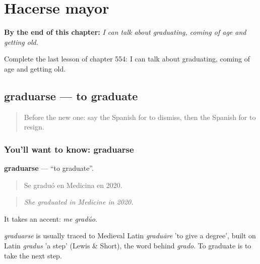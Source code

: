 
\chapter{Hacerse mayor}
\label{ch:es-hacerse-mayor}

\begin{chapteropening}
\textbf{By the end of this chapter:} \emph{I can talk about graduating, coming of age and getting old.}

Complete the last lesson of chapter 554: I can talk about graduating, coming of age and getting old.
\end{chapteropening}

\section[graduarse]{graduarse — to graduate}

\label{lesson:ES-C554-graduarse}



\begin{quote}
Before the new one: say the Spanish for to dismiss, then the Spanish for to resign.
\end{quote}

\subsection*{You'll want to know: graduarse}
\textbf{graduarse} — \textquotedblleft{}to graduate\textquotedblright{}.

\begin{quote}
Se graduó en Medicina en 2020.
\end{quote}

\begin{quote}
\emph{She graduated in Medicine in 2020.}
\end{quote}

It takes an accent: \emph{me gradúo}.

\begin{cousinweb}
\emph{graduarse} is usually traced to Medieval Latin \emph{graduāre} 'to give a degree', built on Latin \emph{gradus} 'a step' (Lewis \& Short), the word behind \emph{grado}. To graduate is to take the next step.
\end{cousinweb}

